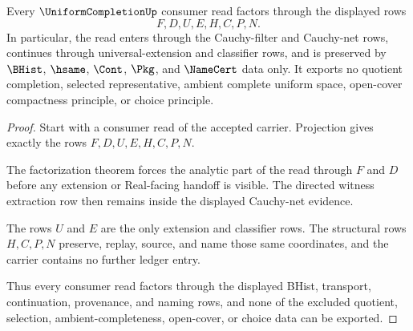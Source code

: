 \begin{theorem}
\label{thm:uniform-completion-ledger-nonescape}
Every $\UniformCompletionUp$ consumer read factors through the displayed rows
$$
F,D,U,E,H,C,P,N .
$$
In particular, the read enters through the Cauchy-filter and Cauchy-net rows,
continues through universal-extension and classifier rows, and is preserved by
$\BHist$, $\hsame$, $\Cont$, $\Pkg$, and $\NameCert$ data only. It exports no
quotient completion, selected representative, ambient complete uniform space,
open-cover compactness principle, or choice principle.
\end{theorem}
\begin{proof}
Start with a consumer read of the accepted carrier. Projection gives exactly
the rows $F,D,U,E,H,C,P,N$.

The factorization theorem forces the analytic part of the read through $F$ and
$D$ before any extension or Real-facing handoff is visible. The directed witness
extraction row then remains inside the displayed Cauchy-net evidence.

The rows $U$ and $E$ are the only extension and classifier rows. The structural
rows $H,C,P,N$ preserve, replay, source, and name those same coordinates, and
the carrier contains no further ledger entry.

Thus every consumer read factors through the displayed BHist, transport,
continuation, provenance, and naming rows, and none of the excluded quotient,
selection, ambient-completeness, open-cover, or choice data can be exported.
\end{proof}

